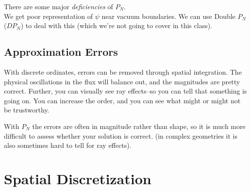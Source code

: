 \documentclass[12pt]{article}
\begin{document}
There are some major \textit{deficiencies} of $P_N$. \\
We get poor representation of $\psi$ near vacuum boundaries. We can use Double $P_N$ ($DP_N$) to deal with this (which we're not going to cover in this class).\\


\subsection*{Approximation Errors}
With discrete ordinates, errors can be removed through spatial integration. The physical oscillations in the flux will balance out, and the magnitudes are pretty correct. Further, you can visually see ray effects--so you can tell that something is going on. You can increase the order, and you can see what might or might not be trustworthy. 

With $P_N$ the errors are often in magnitude rather than shape, so it is much more difficult to assess whether your solution is correct. (in complex geometries it is also sometimes hard to tell for ray effects). 

\section*{Spatial Discretization}
\end{document}
